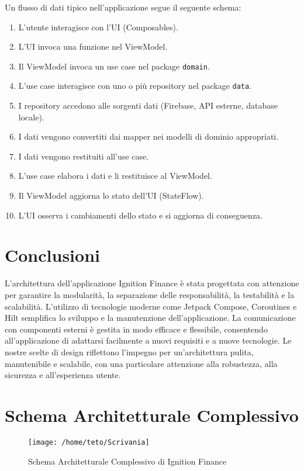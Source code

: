 \documentclass{article}
\begin{document}
Un flusso di dati tipico nell'applicazione segue il seguente schema:

\begin{enumerate}
\item L'utente interagisce con l'UI (Composables).
\item L'UI invoca una funzione nel ViewModel.
\item Il ViewModel invoca un use case nel package \texttt{domain}.
\item L'use case interagisce con uno o più repository nel package \texttt{data}.
\item I repository accedono alle sorgenti dati (Firebase, API esterne, database locale).
\item I dati vengono convertiti dai mapper nei modelli di dominio appropriati.
\item I dati vengono restituiti all'use case.
\item L'use case elabora i dati e li restituisce al ViewModel.
\item Il ViewModel aggiorna lo stato dell'UI (StateFlow).
\item L'UI osserva i cambiamenti dello stato e si aggiorna di conseguenza.
\end{enumerate}

\section{Conclusioni}

L'architettura dell'applicazione Ignition Finance è stata progettata con attenzione per garantire la modularità, la separazione delle responsabilità, la testabilità e la scalabilità. L'utilizzo di tecnologie moderne come Jetpack Compose, Coroutines e Hilt semplifica lo sviluppo e la manutenzione dell'applicazione. La comunicazione con componenti esterni è gestita in modo efficace e flessibile, consentendo all'applicazione di adattarsi facilmente a nuovi requisiti e a nuove tecnologie. Le nostre scelte di design riflettono l'impegno per un'architettura pulita, manutenibile e scalabile, con una particolare attenzione alla robustezza, alla sicurezza e all'esperienza utente.

\section{Schema Architetturale Complessivo}

\begin{figure}[h!]
    \centering
    \texttt{[image: /home/teto/Scrivania]}
    \caption{Schema Architetturale Complessivo di Ignition Finance}
    \label{fig:diagramma_architettura_completa}
\end{figure}
\end{document}
